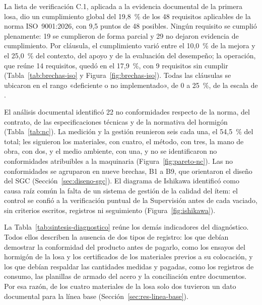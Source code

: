 La lista de verificación C.1, aplicada a la evidencia documental de la primera losa, dio un cumplimiento global del 19,8~\% de los 48 requisitos aplicables de la norma ISO~9001:2026, con 9,5 puntos de 48 posibles. Ningún requisito se cumplió plenamente: 19 se cumplieron de forma parcial y 29 no dejaron evidencia de cumplimiento. Por cláusula, el cumplimiento varió entre el 10,0~\% de la mejora y el 25,0~\% del contexto, del apoyo y de la evaluación del desempeño; la operación, que reúne 14 requisitos, quedó en el 17,9~\%, con 9 requisitos sin cumplir (Tabla~\ref{tab:brechas-iso} y Figura~\ref{fig:brechas-iso}). Todas las cláusulas se ubicaron en el rango «deficiente o no implementado», de 0 a 25~\%, de la escala de \textcite[p.~42]{mamanicalsina2025}.

El análisis documental identificó 22 no conformidades respecto de la norma, del contrato, de las especificaciones técnicas y de la normativa del hormigón (Tabla~\ref{tab:nc}). La medición y la gestión reunieron seis cada una, el 54,5~\% del total; les siguieron los materiales, con cuatro, el método, con tres, la mano de obra, con dos, y el medio ambiente, con una, y no se identificaron no conformidades atribuibles a la maquinaria (Figura~\ref{fig:pareto-nc}). Las no conformidades se agruparon en nueve brechas, B1 a B9, que orientaron el diseño del SGC (Sección~\ref{sec:diseno-sgc}). El diagrama de Ishikawa identificó como causa raíz común la falta de un sistema de gestión de la calidad del ítem: el control se confió a la verificación puntual de la Supervisión antes de cada vaciado, sin criterios escritos, registros ni seguimiento (Figura~\ref{fig:ishikawa}).

La Tabla~\ref{tab:sintesis-diagnostico} reúne los demás indicadores del diagnóstico. Todos ellos describen la ausencia de dos tipos de registro: los que debían demostrar la conformidad del producto antes de pagarlo, como los ensayos del hormigón de la losa y los certificados de los materiales previos a su colocación, y los que debían respaldar las cantidades medidas y pagadas, como los registros de consumo, las planillas de armado del acero y la conciliación entre documentos. Por esa razón, de los cuatro materiales de la losa solo dos tuvieron un dato documental para la línea base (Sección~\ref{sec:res-linea-base}).

